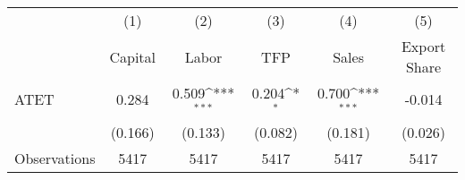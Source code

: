 {
\def\sym#1{\ifmmode^{#1}\else\(^{#1}\)\fi}
\begin{tabular}{l*{5}{c}}
\hline\hline
                    &\multicolumn{1}{c}{(1)}&\multicolumn{1}{c}{(2)}&\multicolumn{1}{c}{(3)}&\multicolumn{1}{c}{(4)}&\multicolumn{1}{c}{(5)}\\
                    &\multicolumn{1}{c}{Capital}&\multicolumn{1}{c}{Labor}&\multicolumn{1}{c}{TFP}&\multicolumn{1}{c}{Sales}&\multicolumn{1}{c}{Export Share}\\
\hline
ATET                &       0.284         &       0.509\sym{***}&       0.204\sym{*}  &       0.700\sym{***}&      -0.014         \\
                    &     (0.166)         &     (0.133)         &     (0.082)         &     (0.181)         &     (0.026)         \\
\hline
Observations        &        5417         &        5417         &        5417         &        5417         &        5417         \\
\hline\hline
\end{tabular}
}
